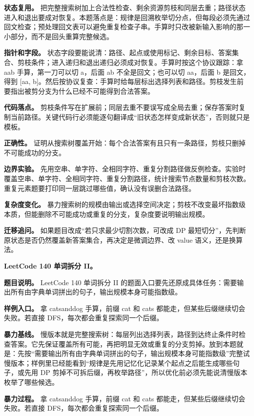 \textbf{状态复用。} 把完整搜索树加上合法性检查、剩余资源剪枝和同层去重；路径状态进入和退出要成对恢复。本题落点是：规律是回溯枚举切分点，但每段必须先通过回文检查；预处理回文表可以避免重复检查子串。手算时只改被新输入影响的那一小部分，而不是回头重算完整候选。

\textbf{指针和字段。} 状态字段要能说清：路径、起点或使用标记、剩余目标、答案集合、剪枝条件；进入递归和退出递归必须成对恢复。手算时按这个协议跟踪：拿 aab 手算，第一刀可以切 a，后面 ab 不全是回文；也可以切 aa，后面 b 是回文，得到 [aa, b]。然后按协议复查：手算时给每层标出选择列表和路径。剪枝发生前要指出被剪分支为什么已经不可能得到合法答案。

\textbf{代码落点。} 剪枝条件写在扩展前；同层去重不要误写成全局去重；保存答案时复制当前路径。关键代码行必须能逐句翻译成“旧状态怎样变成新状态”，否则就只是模板。

\textbf{正确性。} 证明从搜索树覆盖开始：每个合法答案有且只有一条路径，剪枝只删掉不可能成功的分支。

\textbf{边界实验。} 先用空串、单字符、全相同字符、重复分割路径做反例检查。实验时覆盖空串、单字符、全相同字符、重复分割路径，统计搜索节点数量和剪枝次数。重复元素题要打印同一层跳过哪些值，确认没有误删合法路径。

\textbf{复杂度变化。} 暴力搜索树的规模由输出或选择空间决定；剪枝不改变最坏指数级本质，但能删除不可能成功或重复的分支，复杂度要说明输出规模。

\textbf{迁移追问。} 如果题目改成“若只求最少切割次数，可改成 DP 最短切分”，先判断原状态是否仍然覆盖新答案集合，再决定是微调边界、改 value 语义，还是换算法。

\noindent\textbf{LeetCode 140 单词拆分 II。}

\textbf{题目说明。} LeetCode 140 单词拆分 II 的题面入口要先还原成具体任务：需要输出所有由字典单词拼出的句子，输出规模本身可能指数级。

\textbf{样例入口。} 拿 catsanddog 手算，前缀 cat 和 cats 都能走，但某些后缀继续切会失败。若直接 DFS，每次都会重复探索同一个后缀。

\textbf{暴力基线。} 慢版本就是完整搜索树：每层列出选择列表，路径到达终止条件时检查答案。它先保证覆盖所有可能，再把明显无效或重复的分支剪掉。放到本题就是：先按“需要输出所有由字典单词拼出的句子，输出规模本身可能指数级”完整试慢版本；样例里已经能看到“规律是先用记忆化记录某个起点之后能生成哪些句子，或先用 DP 剪掉不可拆后缀，再枚举路径”，所以优化前必须先能说清慢版本枚举了哪些候选。

\textbf{暴力过程。} 拿 catsanddog 手算，前缀 cat 和 cats 都能走，但某些后缀继续切会失败。若直接 DFS，每次都会重复探索同一个后缀。

